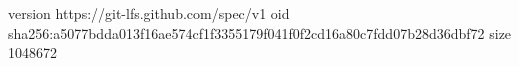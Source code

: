 version https://git-lfs.github.com/spec/v1
oid sha256:a5077bdda013f16ae574cf1f3355179f041f0f2cd16a80c7fdd07b28d36dbf72
size 1048672
